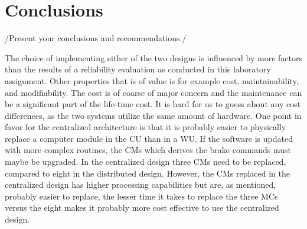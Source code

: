 \newpage
\section{Conclusions}
\label{S6}
/{Present your conclusions and recommendations.}/\cite{sharpe}\cite{gnuplot}

The choice of implementing either of the two designs is influenced by more factors than the results of a reliability evaluation as conducted in this laboratory assignment. Other properties that is of value is for example cost, maintainability, and modifiability. The cost is of coarse of major concern and the maintenance can be a significant part of the life-time cost. It is hard for us to guess about any cost differences, as the two systems utilize the same amount of hardware. One point in favor for the centralized architecture is that it is probably easier to physically replace a computer module in the CU than in a WU. If the software is updated with more complex routines, the CMs which derives the brake commands must maybe be upgraded. In the centralized design three CMs need to be replaced, compared to eight in the distributed design. However, the CMs replaced in the centralized design has higher processing capabilities but are, as mentioned, probably easier to replace, the lesser time it takes to replace the three MCs versus the eight makes it probably more cost effective to use the centralized design. 